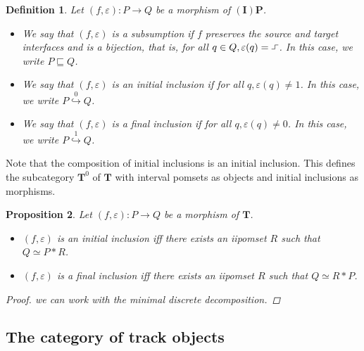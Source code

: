 \documentclass[11pt,a4paper,oldfontcommands]{memoir}
\newcommand*{\intpom}{\TrO}
\newcommand{\TrO}{\mathbf{T}}
\newcommand*\exec{%
  \raisebox{1pt}{%
    \begin{tikzpicture}[x=.8ex,y=1ex,-]
      \draw (0,0) -- (1,0) -- (1,1) -- (2,1);
    \end{tikzpicture}}}
\newcommand{\ininc}{\stackrel{0}{\hookrightarrow} }
\newtheorem{definition}{Definition}
\newtheorem{proposition}[definition]{Proposition}
\begin{document}
\begin{definition}
      Let $(f,\varepsilon): P \to Q$ be a morphism of $\mathbf{(I)P}$.
    \begin{itemize}
        \item We say that $(f,\varepsilon)$ is a subsumption if $f$ preserves the source and target interfaces and is a bijection, that is, for all $q \in Q, \varepsilon(q)= \exec$. In this case, we write $P \sqsubseteq Q$. %
        \item We say that $(f,\varepsilon)$ is an initial inclusion if  for all $q,\varepsilon(q)\neq 1$. In this case, we write $P \ininc Q$.
         \item We say that $(f,\varepsilon)$ is a final inclusion if  for all $q,\varepsilon(q)\neq 0$. In this case, we write $P \stackrel{1}{\hookrightarrow} Q$.
    \end{itemize}
\end{definition}

Note that the composition of initial inclusions is an initial inclusion. This defines the subcategory $\intpom^{0}$ of $\intpom$ with interval pomsets as objects and initial inclusions as morphisms.
\begin{proposition}\label{initial inclusion property}
Let $(f,\varepsilon): P \to Q$ be a morphism of $\intpom$.
\begin{itemize}
    \item $(f,\varepsilon)$ is an initial inclusion iff there exists an iipomset $R$ such that $Q\simeq P*R$.
    \item $(f,\varepsilon)$ is a final inclusion iff there exists an iipomset $R$ such that $Q\simeq R*P$.
\end{itemize}
     \begin{proof}
         we can work with the minimal discrete decomposition.
     \end{proof}
\end{proposition}
\subsection{The category of track objects}
\end{document}
